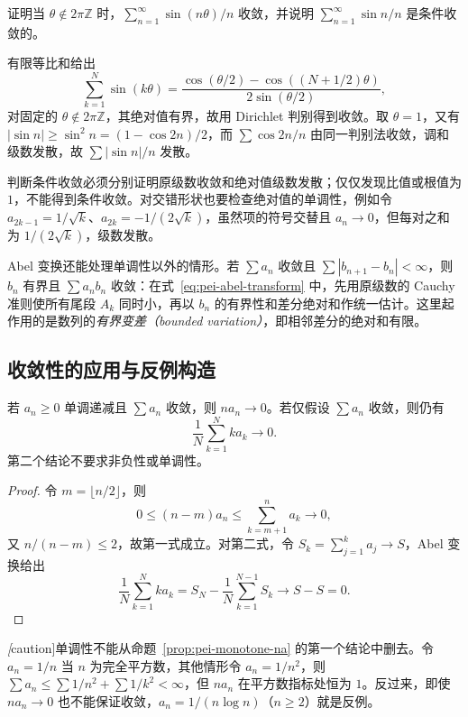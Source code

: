 \begin{example}
\label{ex:pei-sine-harmonic}
证明当 $\theta\notin2\pi\mathbb Z$ 时，$\sum_{n=1}^{\infty}\sin(n\theta)/n$ 收敛，并说明 $\sum_{n=1}^{\infty}\sin n/n$ 是条件收敛的。
\end{example}
\begin{solve}
有限等比和给出
\[
 \sum_{k=1}^{N}\sin(k\theta)
 =\frac{\cos(\theta/2)-\cos((N+1/2)\theta)}{2\sin(\theta/2)},
\]
对固定的 $\theta\notin2\pi\mathbb Z$，其绝对值有界，故用 Dirichlet 判别得到收敛。取 $\theta=1$，又有 $|\sin n|\geq\sin^2n=(1-\cos2n)/2$，而 $\sum\cos2n/n$ 由同一判别法收敛，调和级数发散，故 $\sum|\sin n|/n$ 发散。
\end{solve}

判断条件收敛必须分别证明原级数收敛和绝对值级数发散；仅仅发现比值或根值为 $1$，不能得到条件收敛。对交错形状也要检查绝对值的单调性，例如令 $a_{2k-1}=1/\sqrt k$、$a_{2k}=-1/(2\sqrt k)$，虽然项的符号交替且 $a_n\to0$，但每对之和为 $1/(2\sqrt k)$，级数发散。

Abel 变换还能处理单调性以外的情形。若 $\sum a_n$ 收敛且 $\sum|b_{n+1}-b_n|<\infty$，则 $b_n$ 有界且 $\sum a_nb_n$ 收敛：在式~\eqref{eq:pei-abel-transform} 中，先用原级数的 Cauchy 准则使所有尾段 $A_k$ 同时小，再以 $b_n$ 的有界性和差分绝对和作统一估计。这里起作用的是数列的\emph{有界变差（bounded variation）}，即相邻差分的绝对和有限。

\subsection{收敛性的应用与反例构造}

\begin{proposition}
\label{prop:pei-monotone-na}
若 $a_n\geq0$ 单调递减且 $\sum a_n$ 收敛，则 $na_n\to0$。若仅假设 $\sum a_n$ 收敛，则仍有
\begin{equation}
 \frac1N\sum_{k=1}^{N}ka_k\longrightarrow0.
 \label{eq:pei-weighted-small}
\end{equation}
第二个结论不要求非负性或单调性。
\end{proposition}
\begin{proof}
令 $m=\lfloor n/2\rfloor$，则
\[
 0\leq(n-m)a_n\leq\sum_{k=m+1}^{n}a_k\longrightarrow0,
\]
又 $n/(n-m)\leq2$，故第一式成立。对第二式，令 $S_k=\sum_{j=1}^{k}a_j\to S$，Abel 变换给出
\[
 \frac1N\sum_{k=1}^{N}ka_k
 =S_N-\frac1N\sum_{k=1}^{N-1}S_k\longrightarrow S-S=0.
\]
\end{proof}

\emph[caution]{单调性不能从命题~\ref{prop:pei-monotone-na} 的第一个结论中删去。}令 $a_n=1/n$ 当 $n$ 为完全平方数，其他情形令 $a_n=1/n^2$，则 $\sum a_n\leq\sum1/n^2+\sum1/k^2<\infty$，但 $na_n$ 在平方数指标处恒为 $1$。反过来，即使 $na_n\to0$ 也不能保证收敛，$a_n=1/(n\log n)$（$n\geq2$）就是反例。

